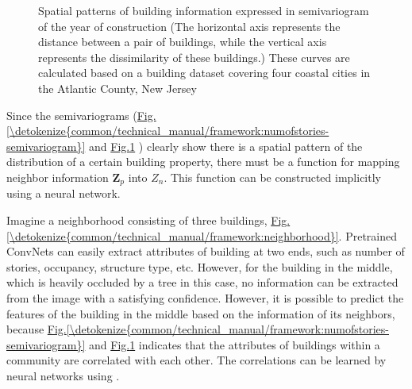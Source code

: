 \documentclass[letterpaper,10pt,english]{sphinxmanual}
\begin{document}
\begin{figure}[htbp]
\centering
\capstart

\noindent{}
\caption{Spatial patterns of building information expressed in semivariogram of the year of construction (The horizontal axis represents the distance between a pair of buildings, while the vertical axis represents the dis\sphinxhyphen{}similarity of these buildings.) These curves are calculated based on a building dataset covering four coastal cities in the Atlantic County, New Jersey}\label{\detokenize{common/technical_manual/framework:id16}}\label{\detokenize{common/technical_manual/framework:yearofbuilt-semivariogram}}\end{figure}

\sphinxAtStartPar
Since the semivariograms (\hyperref[\detokenize{common/technical_manual/framework:numofstories-semivariogram}]{Fig.\@ \ref{\detokenize{common/technical_manual/framework:numofstories-semivariogram}}} and \hyperref[\detokenize{common/technical_manual/framework:yearofbuilt-semivariogram}]{Fig.\@ \ref{\detokenize{common/technical_manual/framework:yearofbuilt-semivariogram}}} )
clearly show there is a spatial pattern of the distribution of a certain building property,
there must be a function for mapping neighbor information \(\boldsymbol{Z}_{p}\) into \(Z_{n}\).
This function can be constructed implicitly using a neural network.

\sphinxAtStartPar
Imagine a neighborhood consisting of three buildings, \hyperref[\detokenize{common/technical_manual/framework:neighborhood}]{Fig.\@ \ref{\detokenize{common/technical_manual/framework:neighborhood}}}.
Pretrained ConvNets can easily extract attributes of building at two ends,
such as number of stories, occupancy, structure type, etc.
However, for the building in the middle, which is heavily occluded by a tree in this case,
no information can be extracted from the image with a satisfying confidence.
However, it is possible to predict the features of the building in the middle based on the information of its neighbors,
because \hyperref[\detokenize{common/technical_manual/framework:numofstories-semivariogram}]{Fig.\@ \ref{\detokenize{common/technical_manual/framework:numofstories-semivariogram}}} and \hyperref[\detokenize{common/technical_manual/framework:yearofbuilt-semivariogram}]{Fig.\@ \ref{\detokenize{common/technical_manual/framework:yearofbuilt-semivariogram}}}  indicates that
the attributes of buildings within a community are correlated with each other.
The correlations can be learned by neural networks using .
\end{document}
